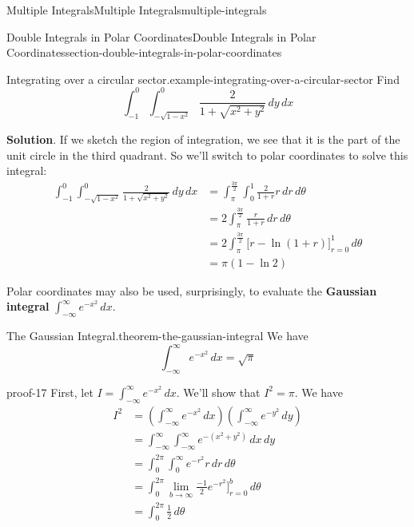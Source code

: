 \documentclass[oneside,10pt,]{book}
\newcommand{\terminology}[1]{\textbf{#1}}
\numberwithin{equation}{section}
\begin{document}
\begin{chapterptx}{Multiple Integrals}{}{Multiple Integrals}{}{}{multiple-integrals}
\begin{sectionptx}{Double Integrals in Polar Coordinates}{}{Double Integrals in Polar Coordinates}{}{}{section-double-integrals-in-polar-coordinates}
\begin{example}{Integrating over a circular sector.}{example-integrating-over-a-circular-sector}%
\hypertarget{p-1492}{}%
Find%
\begin{equation*}
\int_{-1}^{0}\int_{-\sqrt{1-x^{2}}}^{0}\frac{2}{1+\sqrt{x^{2} + y^{2}}}\,dy\,dx
\end{equation*}
%
\par\smallskip%
\noindent\textbf{Solution}.\hypertarget{solution-244}{}\quad%
\hypertarget{p-1493}{}%
If we sketch the region of integration, we see that it is the part of the unit circle in the third quadrant. So we'll switch to polar coordinates to solve this integral:%
\begin{align*}
\int_{-1}^{0}\int_{-\sqrt{1-x^{2}}}^{0}\frac{2}{1+\sqrt{x^{2} + y^{2}}}\,dy\,dx & = \int_{\pi}^{\frac{3\pi}{2}}\int_{0}^{1}\frac{2}{1+r}r\,dr\,d\theta \\
& = 2\int_{\pi}^{\frac{3\pi}{2}} \frac{r}{1+r}\,dr\,d\theta \\
& = 2\int_{\pi}^{\frac{3\pi}{2}} \bigg[r - \ln(1+r)\bigg]_{r=0}^{1}\,d\theta \\
& = \pi(1-\ln2) 
\end{align*}
%
\end{example}
\hypertarget{p-1494}{}%
Polar coordinates may also be used, surprisingly, to evaluate the \terminology{Gaussian integral} \(\int_{-\infty}^{\infty}e^{-x^{2}}\,dx\).%
\begin{theorem}{The Gaussian Integral.}{}{theorem-the-gaussian-integral}%
\hypertarget{p-1495}{}%
We have%
\begin{equation*}
\int_{-\infty}^{\infty}e^{-x^{2}}\,dx = \sqrt{\pi}
\end{equation*}
%
\end{theorem}
\begin{proofptx}{}{proof-17}
\hypertarget{p-1496}{}%
First, let \(I = \int_{-\infty}^{\infty}e^{-x^{2}}\,dx\). We'll show that \(I^{2} = \pi\). We have%
\begin{align*}
I^{2} & = \left(\int_{-\infty}^{\infty}e^{-x^{2}}\,dx\right)\left(\int_{-\infty}^{\infty}e^{-y^{2}}\,dy\right) \\
& = \int_{-\infty}^{\infty}\int_{-\infty}^{\infty}e^{-(x^{2} + y^{2})}\,dx\,dy \\
& = \int_{0}^{2\pi}\int_{0}^{\infty}e^{-r^{2}}r\,dr\,d\theta \\
& = \int_{0}^{2\pi} \lim_{b\to\infty}\frac{-1}{2}e^{-r^{2}}\bigg]_{r=0}^{b}\,d\theta \\
& = \int_{0}^{2\pi} \frac{1}{2}\,d\theta \\

\end{align*}
\end{proofptx}
\end{sectionptx}
\end{chapterptx}
\end{document}
